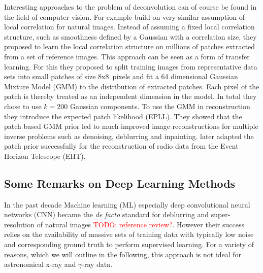 \documentclass[twocolumn]{aastex631}
\newcommand{\gammaray}{$\gamma$-ray\xspace}
\newcommand{\todo}[1]{\textcolor{red}{TODO: #1}\PackageWarning{TODO:}{#1!}}
\begin{document}
    Interesting approaches to the problem of deconvolution can of course be found in the field of computer vision. For example \cite{Zoran2011} build on very similar assumption of local correlation for natural images. Instead of assuming a fixed local correlation structure, such as smoothness defined by a Gaussian with a correlation size, they proposed to learn the local correlation structure on millions of patches extracted from a set of reference images. This approach can be seen as a form of transfer learning. For this they proposed to split training images from representative data sets into small patches of size 8x8~pixels and fit a 64 dimensional Gaussian Mixture Model (GMM) to the distribution of extracted patches. Each pixel of the patch 
    is thereby treated as an independent dimension in the model. In total
    they chose to use $k=200$ Gaussian components. To use the GMM in reconstruction they introduce the expected patch likelihood (EPLL). They showed that the patch based GMM prior led to much improved image reconstructions for multiple inverse problems such as denoising, deblurring and inpainting. \cite{Bouman2016} later adapted the patch prior successfully for the reconstruction of radio data from the Event Horizon Telescope (EHT).
    
    

    \subsection{Some Remarks on Deep Learning Methods}
    In the past decade Machine learning (ML) especially deep convolutional neural networks (CNN) became the \textit{de facto} standard for deblurring and super-resolution of natural images \todo{reference review?}. However their success relies on the availability of massive sets of training data with typically low noise and corresponding ground truth to perform supervised learning. For a variety of reasons, which we will outline in the following, this approach is not ideal for astronomical x-ray and \gammaray data.
    
\end{document}
